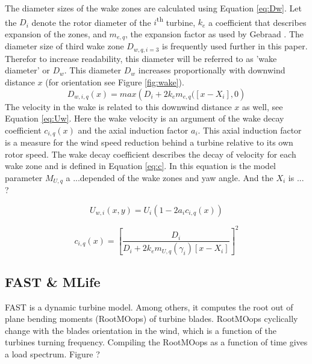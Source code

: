 The diameter sizes of the wake zones are calculated using Equation \ref{eq:Dw}. Let the $D_i$ denote the rotor diameter of the $i${\textsuperscript{th}} turbine, $k_e$ a coefficient that describes expansion of the zones, and $m_{e,q}$, the expansion factor as used by Gebraad \cite{Gebraad2016}. The diameter size of third wake zone $D_{w,q,i=3}$ is frequently used further in this paper. Therefor to increase readability, this diameter will be referred to as 'wake diameter' or $D_w$. This diameter $D_w$ increases proportionally with downwind distance $x$ (for orientation see Figure \ref{fig:wake}).
\begin{equation}
\label{eq:Dw}
D_{w,i,q}(x) = max({D_i + 2k_em_{e,q}([x - X_i],0} )
\end{equation}
The velocity in the wake is related to this downwind distance $x$ as well, see Equation \ref{eq:Uw}. Here the wake velocity is an argument of the wake decay coefficient $c_{i,q}(x)$ and the axial induction factor $a_i$. This axial induction factor is a measure for the wind speed reduction behind a turbine relative to its own rotor speed. The wake decay coefficient describes the decay of velocity for each wake zone and is defined in Equation \ref{eq:c}. In this equation is the model parameter $M_{U,q}$ a ...depended of the wake zones and yaw angle\cite{Gebraad2016}. And the $X_i$ is ... ?

\begin{equation}
\label{eq:Uw}
U_{w,i}(x,y) = U_i\left( {1-2a_{i}c_{i,q}(x)} \right)
\end{equation} 

\begin{equation}
\label{eq:c}
c_{i,q}(x) = \left[ \frac{D_i}{D_i + 2k_em_{U,q}(\gamma_i)[x - X_i]} \right]^2
\end{equation}



\subsection{FAST \& MLife} \label{sec:fast} FAST is a dynamic turbine model\cite{Jonkman2005}. Among others, it computes the root out of plane bending moments (RootMOops) of turbine blades. RootMOops cyclically change with the blades orientation in the wind, which is a function of the turbines turning frequency. Compiling the RootMOops as a function of time gives a load spectrum. Figure ?

